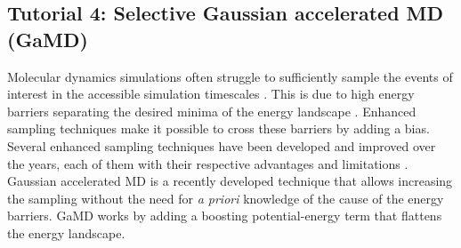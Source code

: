 
\subsection{Tutorial 4: Selective Gaussian accelerated MD (GaMD)}
Molecular dynamics simulations often struggle to sufficiently sample the events of interest in the accessible simulation timescales \cite{hansson2002molecular}.
This is due to high energy barriers separating the desired minima of the energy landscape \cite{volkhardt2022estimating}.
Enhanced sampling techniques make it possible to cross these barriers by adding a bias. Several enhanced sampling techniques have been developed and improved over the years, each of them with their respective advantages and limitations \cite{yang2019enhanced}.
Gaussian accelerated MD is a recently developed technique that allows increasing the sampling without the need for \textit{a priori} knowledge of the cause of the energy barriers. GaMD works by adding a boosting potential-energy term that flattens the energy landscape.


